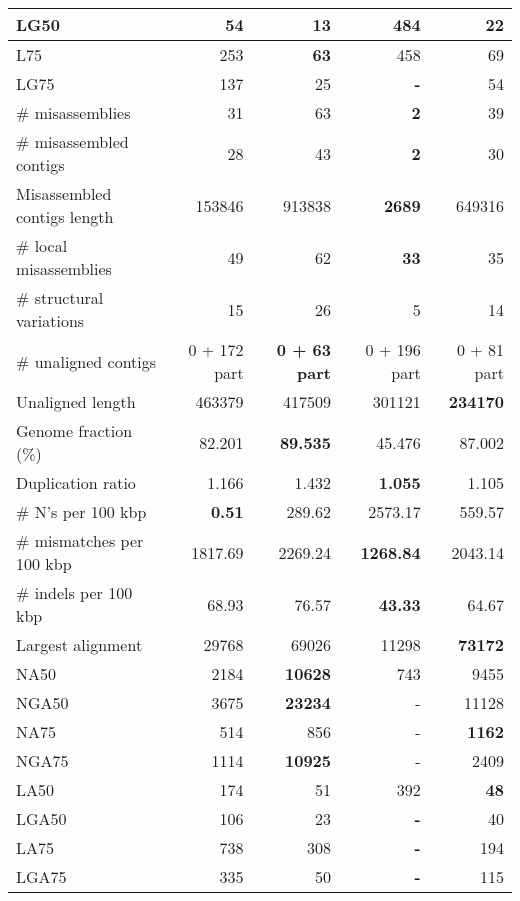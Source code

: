 \documentclass[12pt,a4paper]{article}
\begin{document}
\begin{table}[ht]
\begin{center}
\begin{tabular}{|l*{4}{|r}|}
LG50 & 54 & {\bf 13} & 484 & 22 \\ \hline
L75 & 253 & {\bf 63} & 458 & 69 \\ \hline
LG75 & 137 & 25 & {\bf -} & 54 \\ \hline
\# misassemblies & 31 & 63 & {\bf 2} & 39 \\ \hline
\# misassembled contigs & 28 & 43 & {\bf 2} & 30 \\ \hline
Misassembled contigs length & 153846 & 913838 & {\bf 2689} & 649316 \\ \hline
\# local misassemblies & 49 & 62 & {\bf 33} & 35 \\ \hline
\# structural variations & 15 & 26 & 5 & 14 \\ \hline
\# unaligned contigs & 0 + 172 part & {\bf 0 + 63 part} & 0 + 196 part & 0 + 81 part \\ \hline
Unaligned length & 463379 & 417509 & 301121 & {\bf 234170} \\ \hline
Genome fraction (\%) & 82.201 & {\bf 89.535} & 45.476 & 87.002 \\ \hline
Duplication ratio & 1.166 & 1.432 & {\bf 1.055} & 1.105 \\ \hline
\# N's per 100 kbp & {\bf 0.51} & 289.62 & 2573.17 & 559.57 \\ \hline
\# mismatches per 100 kbp & 1817.69 & 2269.24 & {\bf 1268.84} & 2043.14 \\ \hline
\# indels per 100 kbp & 68.93 & 76.57 & {\bf 43.33} & 64.67 \\ \hline
Largest alignment & 29768 & 69026 & 11298 & {\bf 73172} \\ \hline
NA50 & 2184 & {\bf 10628} & 743 & 9455 \\ \hline
NGA50 & 3675 & {\bf 23234} & - & 11128 \\ \hline
NA75 & 514 & 856 & - & {\bf 1162} \\ \hline
NGA75 & 1114 & {\bf 10925} & - & 2409 \\ \hline
LA50 & 174 & 51 & 392 & {\bf 48} \\ \hline
LGA50 & 106 & 23 & {\bf -} & 40 \\ \hline
LA75 & 738 & 308 & {\bf -} & 194 \\ \hline
LGA75 & 335 & 50 & {\bf -} & 115 \\ \hline
\end{tabular}
\end{center}
\end{table}
\end{document}
